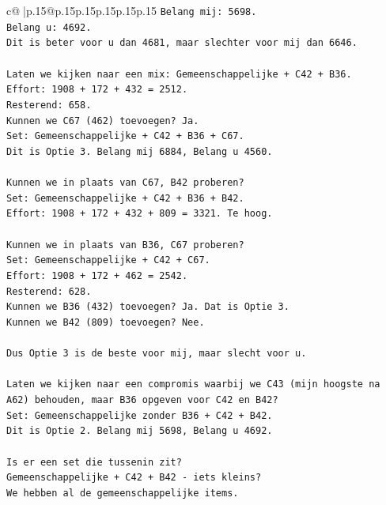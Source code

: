 \documentclass{article}
\begin{document}
{\begin{supertabular}{c@{$\;$}|p{.15\linewidth}@{}p{.15\linewidth}p{.15\linewidth}p{.15\linewidth}p{.15\linewidth}p{.15\linewidth}}
{{{\texttt{Belang mij: 5698.} \\
\texttt{Belang u: 4692.} \\
\texttt{Dit is beter voor u dan 4681, maar slechter voor mij dan 6646.} \\
\\ 
\texttt{Laten we kijken naar een mix: Gemeenschappelijke + C42 + B36.} \\
\texttt{Effort: 1908 + 172 + 432 = 2512.} \\
\texttt{Resterend: 658.} \\
\texttt{Kunnen we C67 (462) toevoegen? Ja.} \\
\texttt{Set: Gemeenschappelijke + C42 + B36 + C67.} \\
\texttt{Dit is Optie 3. Belang mij 6884, Belang u 4560.} \\
\\ 
\texttt{Kunnen we in plaats van C67, B42 proberen?} \\
\texttt{Set: Gemeenschappelijke + C42 + B36 + B42.} \\
\texttt{Effort: 1908 + 172 + 432 + 809 = 3321. Te hoog.} \\
\\ 
\texttt{Kunnen we in plaats van B36, C67 proberen?} \\
\texttt{Set: Gemeenschappelijke + C42 + C67.} \\
\texttt{Effort: 1908 + 172 + 462 = 2542.} \\
\texttt{Resterend: 628.} \\
\texttt{Kunnen we B36 (432) toevoegen? Ja. Dat is Optie 3.} \\
\texttt{Kunnen we B42 (809) toevoegen? Nee.} \\
\\ 
\texttt{Dus Optie 3 is de beste voor mij, maar slecht voor u.} \\
\\ 
\texttt{Laten we kijken naar een compromis waarbij we C43 (mijn hoogste na A62) behouden, maar B36 opgeven voor C42 en B42?} \\
\texttt{Set: Gemeenschappelijke zonder B36 + C42 + B42.} \\
\texttt{Dit is Optie 2. Belang mij 5698, Belang u 4692.} \\
\\ 
\texttt{Is er een set die tussenin zit?} \\
\texttt{Gemeenschappelijke + C42 + B42 {-} iets kleins?} \\
\texttt{We hebben al de gemeenschappelijke items.} \\
}}}
\end{supertabular}}
\end{document}

